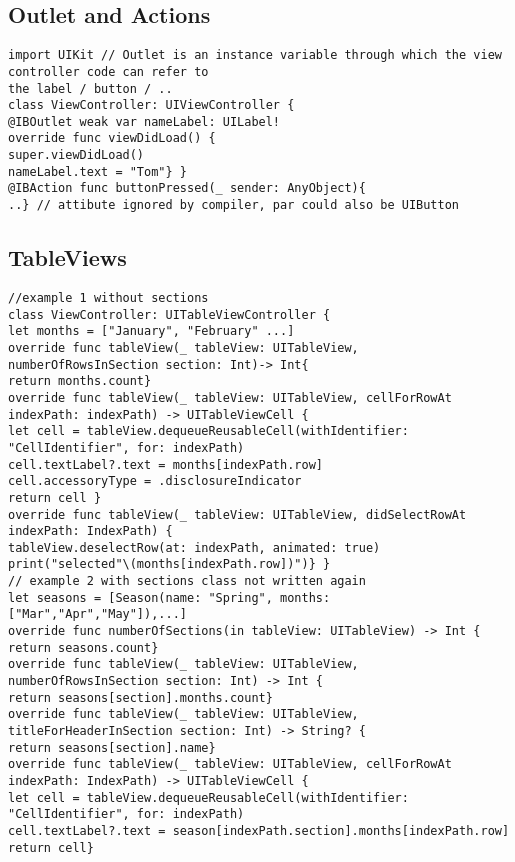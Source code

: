 \subsection{Outlet and Actions}
\begin{lstlisting}
import UIKit // Outlet is an instance variable through which the view controller code can refer to
the label / button / ..
class ViewController: UIViewController {
@IBOutlet weak var nameLabel: UILabel!
override func viewDidLoad() {
super.viewDidLoad()
nameLabel.text = "Tom"} }
@IBAction func buttonPressed(_ sender: AnyObject){
..} // attibute ignored by compiler, par could also be UIButton
\end{lstlisting}

\subsection{TableViews}
\begin{lstlisting}
//example 1 without sections
class ViewController: UITableViewController {
let months = ["January", "February" ...]
override func tableView(_ tableView: UITableView, numberOfRowsInSection section: Int)-> Int{
return months.count}
override func tableView(_ tableView: UITableView, cellForRowAt indexPath: indexPath) -> UITableViewCell {
let cell = tableView.dequeueReusableCell(withIdentifier: "CellIdentifier", for: indexPath)
cell.textLabel?.text = months[indexPath.row]
cell.accessoryType = .disclosureIndicator
return cell }
override func tableView(_ tableView: UITableView, didSelectRowAt indexPath: IndexPath) {
tableView.deselectRow(at: indexPath, animated: true)
print("selected"\(months[indexPath.row])")} } 
// example 2 with sections class not written again
let seasons = [Season(name: "Spring", months: ["Mar","Apr","May"]),...]
override func numberOfSections(in tableView: UITableView) -> Int { return seasons.count}
override func tableView(_ tableView: UITableView, numberOfRowsInSection section: Int) -> Int {
return seasons[section].months.count}
override func tableView(_ tableView: UITableView, titleForHeaderInSection section: Int) -> String? {
return seasons[section].name}
override func tableView(_ tableView: UITableView, cellForRowAt indexPath: IndexPath) -> UITableViewCell {
let cell = tableView.dequeueReusableCell(withIdentifier: "CellIdentifier", for: indexPath)
cell.textLabel?.text = season[indexPath.section].months[indexPath.row]
return cell}
\end{lstlisting}

